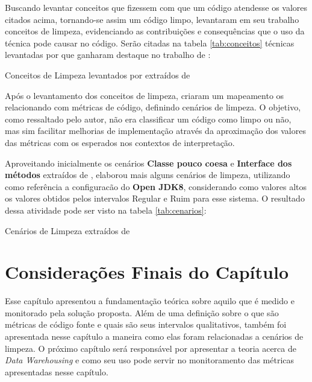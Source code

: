Buscando levantar conceitos que fizessem com que um código atendesse os valores citados acima, tornando-se assim um código limpo,  levantaram em seu trabalho conceitos de limpeza, evidenciando as contribuições e consequências que o uso da técnica pode causar no código. Serão citadas na tabela \ref{tab:conceitos} técnicas levantadas por  que ganharam destaque no trabalho de :

 \begin{table}[!ht]
\centering

\caption{Conceitos de Limpeza levantados por  extraídos de }
\label{tab:conceitos}
\end{table}
\FloatBarrier

Após o levantamento dos conceitos de limpeza,  criaram um mapeamento os relacionando com métricas de código, definindo cenários de limpeza. O objetivo, como ressaltado pelo autor, não era classificar um código como limpo ou não, mas sim facilitar melhorias de implementação através da aproximação dos valores das métricas com os esperados nos contextos de interpretação.

Aproveitando inicialmente os cenários \textbf{Classe pouco coesa} e \textbf{Interface dos métodos} extraídos de  ,  elaborou mais alguns cenários de limpeza, utilizando como referência a configuracão do \textbf{Open JDK8}, considerando como valores altos os valores obtidos pelos intervalos  Regular e Ruim para esse sistema. O resultado dessa atividade pode ser visto na tabela \ref{tab:cenarios}:

\begin{table}
\begin{table}[H]
\centering

\caption{Cenários de Limpeza extraídos de }
\label{tab:cenarios}
\end{table}
\FloatBarrier
\end{table}  

\section{Considerações Finais do Capítulo}  

Esse capítulo apresentou a fundamentação teórica sobre aquilo que é medido e monitorado pela solução proposta. Além de uma definição sobre o que são métricas de código fonte e quais são seus intervalos qualitativos, também foi apresentada nesse capítulo a maneira como elas foram relacionadas a cenários de limpeza. O próximo capítulo será responsável por apresentar a teoria acerca de \textit{Data Warehousing} e como seu uso pode servir no monitoramento das métricas apresentadas nesse capítulo.
